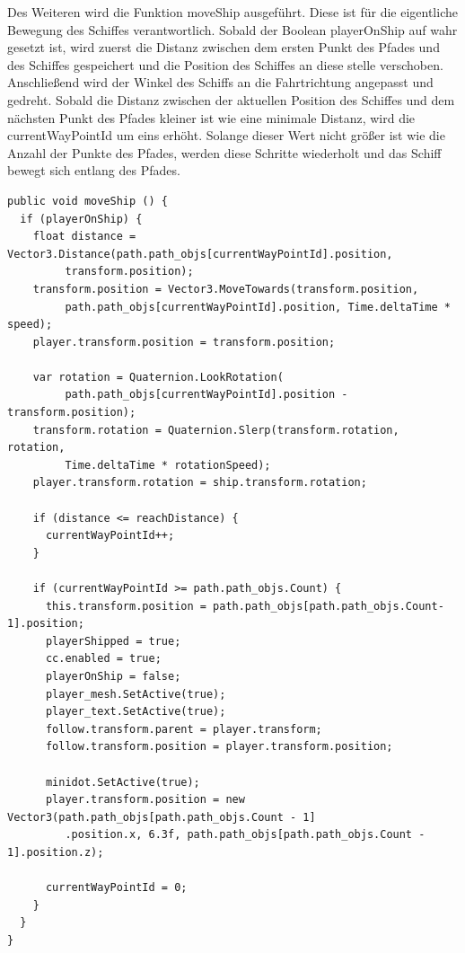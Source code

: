 			Des Weiteren wird die Funktion moveShip ausgeführt. Diese ist für die eigentliche Bewegung des Schiffes verantwortlich. Sobald der Boolean playerOnShip auf wahr gesetzt ist, wird zuerst die Distanz zwischen dem ersten Punkt des Pfades und des Schiffes gespeichert und die Position des Schiffes an diese stelle verschoben. Anschließend wird der Winkel des Schiffs an die Fahrtrichtung angepasst und gedreht. Sobald die Distanz zwischen der aktuellen Position des Schiffes und dem nächsten Punkt des Pfades kleiner ist wie eine minimale Distanz, wird die currentWayPointId um eins erhöht. Solange dieser Wert nicht größer ist wie die Anzahl der Punkte des Pfades, werden diese Schritte wiederholt und das Schiff bewegt sich entlang des Pfades.

\begin{scriptsize}
\lstset{
	float,
	caption=Methode moveShip, 
	language=[Sharp]C, 
	frame=single,  
	showstringspaces=false, 
	showspaces=false, 
	numbers=left, 
	captionpos=b, 
	belowcaptionskip=4pt,
	basicstyle=\ttfamily
} 
\begin{lstlisting}[label=lst:methode2]
public void moveShip () {
  if (playerOnShip) {
    float distance = Vector3.Distance(path.path_objs[currentWayPointId].position, 
  	     transform.position);
    transform.position = Vector3.MoveTowards(transform.position, 
  	     path.path_objs[currentWayPointId].position, Time.deltaTime * speed);
    player.transform.position = transform.position;

    var rotation = Quaternion.LookRotation(
         path.path_objs[currentWayPointId].position - transform.position);
    transform.rotation = Quaternion.Slerp(transform.rotation, rotation, 
         Time.deltaTime * rotationSpeed);
    player.transform.rotation = ship.transform.rotation;

    if (distance <= reachDistance) {
      currentWayPointId++;
    }

    if (currentWayPointId >= path.path_objs.Count) {
      this.transform.position = path.path_objs[path.path_objs.Count-1].position;
      playerShipped = true;
      cc.enabled = true;
      playerOnShip = false;
      player_mesh.SetActive(true);
      player_text.SetActive(true);
      follow.transform.parent = player.transform;
      follow.transform.position = player.transform.position;

      minidot.SetActive(true);
      player.transform.position = new Vector3(path.path_objs[path.path_objs.Count - 1]
         .position.x, 6.3f, path.path_objs[path.path_objs.Count - 1].position.z);
                
      currentWayPointId = 0;
    }
  }
}
    
\end{lstlisting}
\end{scriptsize}
